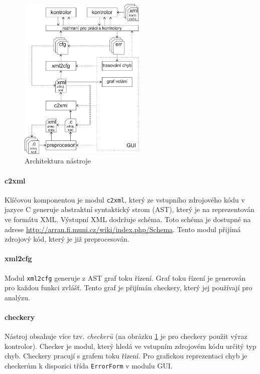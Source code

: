 \documentclass[11pt,final,oneside]{fithesis}
\begin{document}
\begin{figure}[ht]
\begin{center}
\ifpdf
	\includegraphics[width=6cm]{img/arch.png}
\fi
\end{center}
\caption{Architektura nástroje}
\label{arch-img}
\end{figure}

\paragraph*{c2xml} Klíčovou komponentou je modul \texttt{c2xml}, který ze vstupního zdrojového kódu v jazyce C generuje abstraktní syntaktický strom (AST), který je na reprezentován ve formátu XML. Výstupní XML dodržuje schéma. Toto schéma je dostupné na adrese \url{http://arran.fi.muni.cz/wiki/index.php/Schema}. Tento modul přijímá zdrojový kód, který je již preprocesován.

\paragraph{xml2cfg} Modul \texttt{xml2cfg} generuje z AST graf toku řízení. Graf toku řízení je generován pro každou funkci zvlášť. Tento graf je přijímán checkery, který jej používají pro analýzu. 

\paragraph{checkery} Nástroj obsahuje více tzv. \textit{checkerů} (na obrázku \ref{arch-img} je pro checkery použit výraz kontrolor). Checker je modul, který hledá ve vstupním zdrojovém kódu určitý typ chyb. Checkery pracují s grafem toku řízení. Pro grafickou reprezentaci chyb je checkerům k dispozici třída \texttt{ErrorForm} v modulu GUI.
\end{document}
